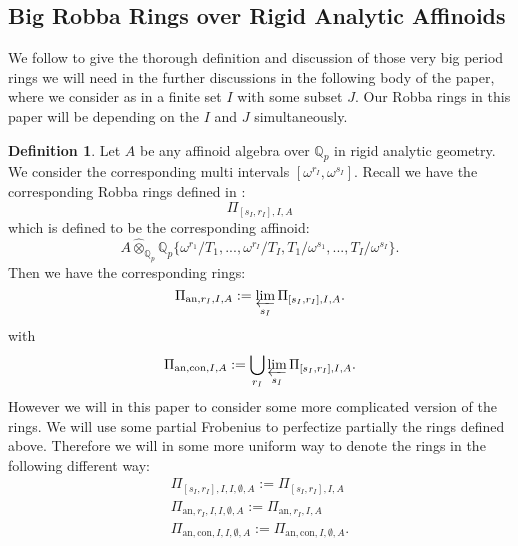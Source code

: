 \documentclass[12pt]{amsart}
\theoremstyle{definition}
\newtheorem{definition}[theorem]{Definition}
\numberwithin{equation}{section}
\begin{document}
\subsection{Big Robba Rings over Rigid Analytic Affinoids}

\noindent We follow \cite{T1} to give the thorough definition and discussion of those very big period rings we will need in the further discussions in the following body of the paper, where we consider as in \cite{T1} a finite set $I$ with some subset $J$. Our Robba rings in this paper will be depending on the $I$ and $J$ simultaneously. 


\begin{definition}
Let $A$ be any affinoid algebra over $\mathbb{Q}_p$ in rigid analytic geometry. We consider the corresponding multi intervals $[\omega^{r_I},\omega^{s_I}]$. Recall we have the corresponding Robba rings defined in \cite[Definition 2.4]{T1}:
\begin{displaymath}
\Pi_{[s_I,r_I],I,A}	
\end{displaymath}
which is defined to be the corresponding affinoid:
\begin{displaymath}
A\widehat{\otimes}_{\mathbb{Q}_p}\mathbb{Q}_p\{\omega^{r_1}/T_1,...,\omega^{r_I}/T_I,T_1/\omega^{s_1},...,T_I/\omega^{s_I}\}.	
\end{displaymath}
Then we have the corresponding rings:
\begin{displaymath}
\Pi_{\mathrm{an},r_I,I,A}:= \varprojlim_{s_I} \Pi_{[s_I,r_I],I,A}.			
\end{displaymath}
with 
\begin{displaymath}
\Pi_{\mathrm{an,con},I,A}:= \bigcup_{r_I}\varprojlim_{s_I} \Pi_{[s_I,r_I],I,A}.			
\end{displaymath}
However we will in this paper to consider some more complicated version of the rings. We will use some partial Frobenius to perfectize partially the rings defined above. Therefore we will in some more uniform way to denote the rings in the following different way:
\begin{align}
\Pi_{[s_I,r_I],I,I,\emptyset,A}:=\Pi_{[s_I,r_I],I,A}\\
\Pi_{\mathrm{an},r_I,I,I,\emptyset,A}:=\Pi_{\mathrm{an},r_I,I,A}\\
\Pi_{\mathrm{an,con},I,I,\emptyset,A}:=\Pi_{\mathrm{an,con},I,\emptyset,A}.	
\end{align}
	
\end{definition}
\end{document}
